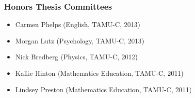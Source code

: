 \documentclass[article,10pt]{article}
\begin{document}
\subsubsection*{Honors Thesis Committees}
\label{sec:orge595150}

\begin{itemize}
\item Carmen Phelps (English, TAMU-C, 2013)
\item Morgan Lutz (Psychology, TAMU-C, 2013)
\item Nick Bredberg (Physics, TAMU-C, 2012)
\item Kallie Hinton (Mathematics Education, TAMU-C, 2011)
\item Lindsey Preston (Mathematics Education, TAMU-C, 2011)
\end{itemize}
\end{document}
